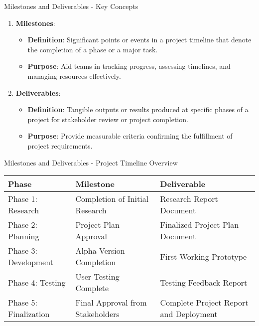 \documentclass[aspectratio=169]{beamer}
\begin{document}
\begin{frame}[fragile]{Milestones and Deliverables - Key Concepts}
  \begin{enumerate}
    \item \textbf{Milestones}:
      \begin{itemize}
        \item \textbf{Definition}: Significant points or events in a project timeline that denote the completion of a phase or a major task.
        \item \textbf{Purpose}: Aid teams in tracking progress, assessing timelines, and managing resources effectively.
      \end{itemize}
    
    \item \textbf{Deliverables}:
      \begin{itemize}
        \item \textbf{Definition}: Tangible outputs or results produced at specific phases of a project for stakeholder review or project completion.
        \item \textbf{Purpose}: Provide measurable criteria confirming the fulfillment of project requirements.
      \end{itemize}
  \end{enumerate}
\end{frame}

\begin{frame}[fragile]{Milestones and Deliverables - Project Timeline Overview}
  \begin{center}
    \begin{tabular}{|l|l|l|}
      \hline
      \textbf{Phase} & \textbf{Milestone} & \textbf{Deliverable} \\
      \hline
      Phase 1: Research & Completion of Initial Research & Research Report Document \\
      Phase 2: Planning & Project Plan Approval & Finalized Project Plan Document \\
      Phase 3: Development & Alpha Version Completion & First Working Prototype \\
      Phase 4: Testing & User Testing Complete & Testing Feedback Report \\
      Phase 5: Finalization & Final Approval from Stakeholders & Complete Project Report and Deployment \\
      \hline
    \end{tabular}
  \end{center}
\end{frame}
\end{document}
